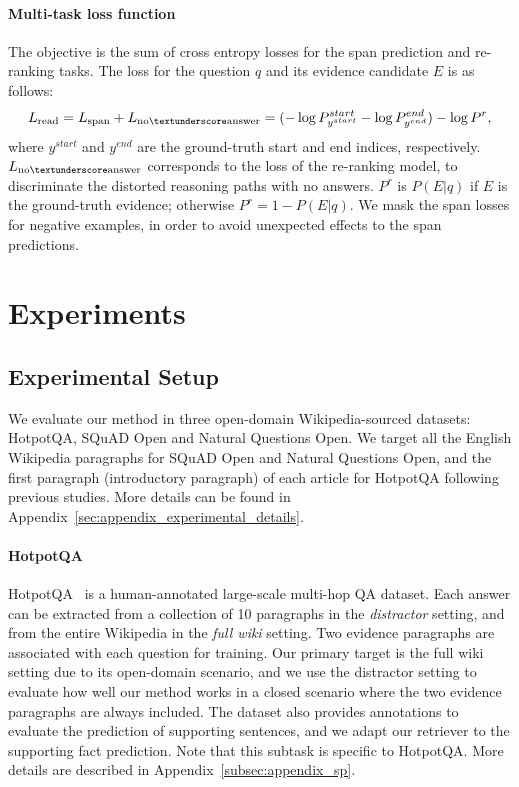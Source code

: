 \vspace{-2mm}\paragraph{Multi-task loss function}
The objective is the sum of cross entropy losses for the span prediction and re-ranking tasks.
The loss for the question $q$ and its evidence candidate $E$ is as follows:
\begin{equation}
    L_\mathrm{read} = L_\mathrm{span} + L_\mathrm{no\textunderscore answer} = (- \log{P^{start}_{y^{start}}} - \log{P^{end}_{y^{end}}}) - \log{P^r},
\end{equation}
where $y^{start}$ and $y^{end}$ are the ground-truth start and end indices, respectively.
$L_\mathrm{no\textunderscore answer}$ corresponds to the loss of the re-ranking model, to discriminate the distorted reasoning paths with no answers.
$P^r$ is $P(E|q)$ if $E$ is the ground-truth evidence; otherwise $P^r=1-P(E|q)$.
We mask the span losses for negative examples, in order to avoid unexpected effects to the span predictions.

\section{Experiments}
\subsection{Experimental Setup}
We evaluate our method in three open-domain Wikipedia-sourced datasets: HotpotQA, SQuAD Open and Natural Questions Open.
We target all the English Wikipedia paragraphs for SQuAD Open and Natural Questions Open, and the first paragraph (introductory paragraph) of each article for HotpotQA following previous studies.
More details can be found in Appendix~\ref{sec:appendix_experimental_details}.

\vspace{-2mm}\paragraph{HotpotQA}
HotpotQA~\citep{yang-etal-2018-hotpotqa} is a human-annotated large-scale multi-hop QA dataset.
Each answer can be extracted from a collection of 10 paragraphs in the {\it distractor} setting, and from the entire Wikipedia in the {\it full wiki} setting.
Two evidence paragraphs are associated with each question for training.
Our primary target is the full wiki setting due to its open-domain scenario, and we use the distractor setting to evaluate how well our method works in a closed scenario where the two evidence paragraphs are always included.
The dataset also provides annotations to evaluate the prediction of supporting sentences, and we adapt our retriever to the supporting fact prediction.
Note that this subtask is specific to HotpotQA.
More details are described in Appendix~\ref{subsec:appendix_sp}.

